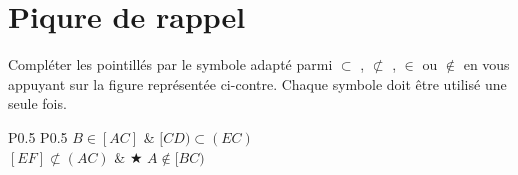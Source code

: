 \documentclass[oneside,12pt]{exam}          %
\begin{document}
\section{Piqure de rappel}
\begin{minipage}{0.6\textwidth}
	Compléter les pointillés par le symbole adapté parmi $\subset$ , $\not\subset$ , $\in$ ou $\notin$ en vous appuyant sur la figure représentée ci-contre. Chaque symbole doit être utilisé une seule fois.
	
	\renewcommand{\arraystretch}{2}
	\begin{tabular}{P{0.5\textwidth} P{0.5\textwidth}}
		$B \in [AC]$ & $[CD) \subset (EC)$ \\
		$[EF] \not\subset (AC)$ & $\bigstar$ $A \not\in [BC)$
	\end{tabular}
\end{minipage} \hspace{10mm}
\begin{minipage}{0.4\textwidth}
\end{minipage}
\end{document}
